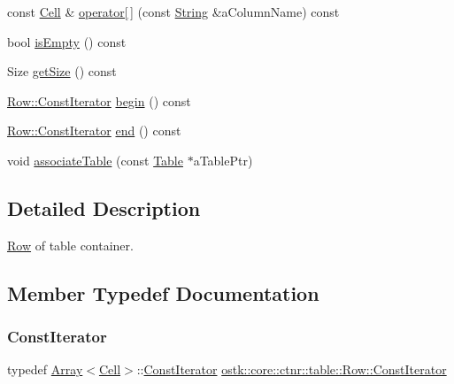\begin{DoxyCompactItemize}
\item 
const \hyperlink{namespaceostk_1_1core_1_1ctnr_1_1table_a697fb8eda17fde15703741a0c49036b9}{Cell} \& \hyperlink{classostk_1_1core_1_1ctnr_1_1table_1_1_row_a6eb22961d8f6a110582f2d4690e89407}{operator\mbox{[}$\,$\mbox{]}} (const \hyperlink{classostk_1_1core_1_1types_1_1_string}{String} \&a\+Column\+Name) const
\item 
bool \hyperlink{classostk_1_1core_1_1ctnr_1_1table_1_1_row_a8a2ad51b38d815d1e9f7ed7de9d67f04}{is\+Empty} () const
\item 
Size \hyperlink{classostk_1_1core_1_1ctnr_1_1table_1_1_row_a259bcec40e772951de4842f25617c227}{get\+Size} () const
\item 
\hyperlink{classostk_1_1core_1_1ctnr_1_1table_1_1_row_af1eb8276a850652cbeb4ee3575aa7db3}{Row\+::\+Const\+Iterator} \hyperlink{classostk_1_1core_1_1ctnr_1_1table_1_1_row_a9a6c41ee47d716cb5c20c75156669a47}{begin} () const
\item 
\hyperlink{classostk_1_1core_1_1ctnr_1_1table_1_1_row_af1eb8276a850652cbeb4ee3575aa7db3}{Row\+::\+Const\+Iterator} \hyperlink{classostk_1_1core_1_1ctnr_1_1table_1_1_row_a53825178dba964bc80876b0518483ce0}{end} () const
\item 
void \hyperlink{classostk_1_1core_1_1ctnr_1_1table_1_1_row_a9ac16652d96ec69bf674d607f928bb3f}{associate\+Table} (const \hyperlink{classostk_1_1core_1_1ctnr_1_1_table}{Table} $\ast$a\+Table\+Ptr)
\end{DoxyCompactItemize}


\subsection{Detailed Description}
\hyperlink{classostk_1_1core_1_1ctnr_1_1table_1_1_row}{Row} of table container. 

\subsection{Member Typedef Documentation}
\mbox{\label{classostk_1_1core_1_1ctnr_1_1table_1_1_row_af1eb8276a850652cbeb4ee3575aa7db3}} 
\subsubsection{\texorpdfstring{Const\+Iterator}{ConstIterator}}
{\footnotesize\ttfamily typedef \hyperlink{classostk_1_1core_1_1ctnr_1_1_array}{Array}$<$\hyperlink{namespaceostk_1_1core_1_1ctnr_1_1table_a697fb8eda17fde15703741a0c49036b9}{Cell}$>$\+::\hyperlink{classostk_1_1core_1_1ctnr_1_1table_1_1_row_af1eb8276a850652cbeb4ee3575aa7db3}{Const\+Iterator} \hyperlink{classostk_1_1core_1_1ctnr_1_1table_1_1_row_af1eb8276a850652cbeb4ee3575aa7db3}{ostk\+::core\+::ctnr\+::table\+::\+Row\+::\+Const\+Iterator}}



